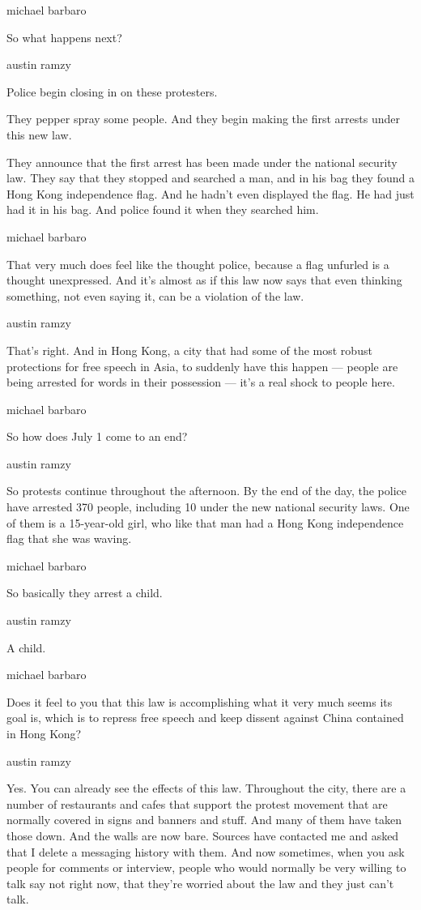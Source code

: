 michael barbaro

So what happens next?

austin ramzy

Police begin closing in on these protesters.

They pepper spray some people. And they begin making the first arrests
under this new law.

They announce that the first arrest has been made under the national
security law. They say that they stopped and searched a man, and in his
bag they found a Hong Kong independence flag. And he hadn't even
displayed the flag. He had just had it in his bag. And police found it
when they searched him.

michael barbaro

That very much does feel like the thought police, because a flag
unfurled is a thought unexpressed. And it's almost as if this law now
says that even thinking something, not even saying it, can be a
violation of the law.

austin ramzy

That's right. And in Hong Kong, a city that had some of the most robust
protections for free speech in Asia, to suddenly have this happen ---
people are being arrested for words in their possession --- it's a real
shock to people here.

michael barbaro

So how does July 1 come to an end?

austin ramzy

So protests continue throughout the afternoon. By the end of the day,
the police have arrested 370 people, including 10 under the new national
security laws. One of them is a 15-year-old girl, who like that man had
a Hong Kong independence flag that she was waving.

michael barbaro

So basically they arrest a child.

austin ramzy

A child.

michael barbaro

Does it feel to you that this law is accomplishing what it very much
seems its goal is, which is to repress free speech and keep dissent
against China contained in Hong Kong?

austin ramzy

Yes. You can already see the effects of this law. Throughout the city,
there are a number of restaurants and cafes that support the protest
movement that are normally covered in signs and banners and stuff. And
many of them have taken those down. And the walls are now bare. Sources
have contacted me and asked that I delete a messaging history with them.
And now sometimes, when you ask people for comments or interview, people
who would normally be very willing to talk say not right now, that
they're worried about the law and they just can't talk.


